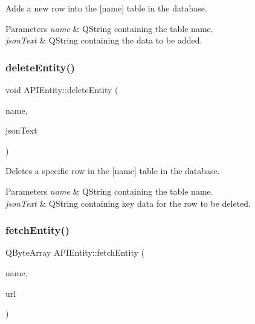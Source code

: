 Adds a new row into the \mbox{[}name\mbox{]} table in the database. 
\begin{DoxyParams}{Parameters}
{\em name} & Q\+String containing the table name. \\
\hline
{\em json\+Text} & Q\+String containing the data to be added. \\
\hline
\end{DoxyParams}
\mbox{\label{class_a_p_i_entity_ade40ac225523f1d00ed7c1eb8bdfec96}} 
\subsubsection{\texorpdfstring{delete\+Entity()}{deleteEntity()}}
{\footnotesize\ttfamily void A\+P\+I\+Entity\+::delete\+Entity (\begin{DoxyParamCaption}\item[{const Q\+String \&}]{name,  }\item[{const Q\+String \&}]{json\+Text }\end{DoxyParamCaption})}

Deletes a specific row in the \mbox{[}name\mbox{]} table in the database. 
\begin{DoxyParams}{Parameters}
{\em name} & Q\+String containing the table name. \\
\hline
{\em json\+Text} & Q\+String containing key data for the row to be deleted. \\
\hline
\end{DoxyParams}
\mbox{\label{class_a_p_i_entity_a4ff9b9128b1ad595dd07006544c99dee}} 
\subsubsection{\texorpdfstring{fetch\+Entity()}{fetchEntity()}}
{\footnotesize\ttfamily Q\+Byte\+Array A\+P\+I\+Entity\+::fetch\+Entity (\begin{DoxyParamCaption}\item[{const Q\+String \&}]{name,  }\item[{const Q\+Url \&}]{url }\end{DoxyParamCaption})}

